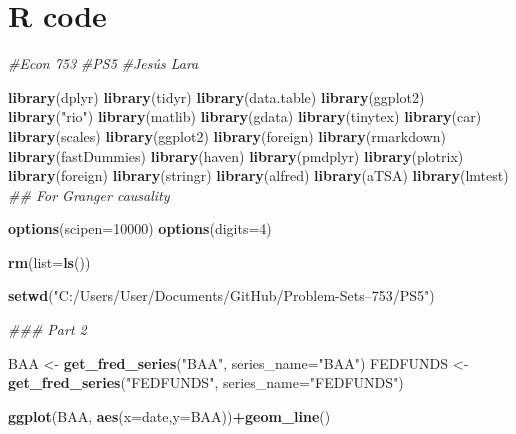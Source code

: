 \documentclass[
]{article}
\newenvironment{Shaded}{\begin{snugshade}}{\end{snugshade}}
\newcommand{\CommentTok}[1]{\textcolor[rgb]{0.56,0.35,0.01}{\textit{#1}}}
\newcommand{\DataTypeTok}[1]{\textcolor[rgb]{0.13,0.29,0.53}{#1}}
\newcommand{\DecValTok}[1]{\textcolor[rgb]{0.00,0.00,0.81}{#1}}
\newcommand{\KeywordTok}[1]{\textcolor[rgb]{0.13,0.29,0.53}{\textbf{#1}}}
\newcommand{\NormalTok}[1]{#1}
\newcommand{\OperatorTok}[1]{\textcolor[rgb]{0.81,0.36,0.00}{\textbf{#1}}}
\newcommand{\StringTok}[1]{\textcolor[rgb]{0.31,0.60,0.02}{#1}}
\begin{document}
\pagebreak

\hypertarget{r-code}{%
\section{R code}\label{r-code}}

\begin{Shaded}
\begin{Highlighting}[]
\CommentTok{#Econ 753}
\CommentTok{#PS5}
\CommentTok{#Jesús Lara}

\KeywordTok{library}\NormalTok{(dplyr)}
\KeywordTok{library}\NormalTok{(tidyr)}
\KeywordTok{library}\NormalTok{(data.table)}
\KeywordTok{library}\NormalTok{(ggplot2)}
\KeywordTok{library}\NormalTok{(}\StringTok{"rio"}\NormalTok{)}
\KeywordTok{library}\NormalTok{(matlib)}
\KeywordTok{library}\NormalTok{(gdata)}
\KeywordTok{library}\NormalTok{(tinytex)}
\KeywordTok{library}\NormalTok{(car)}
\KeywordTok{library}\NormalTok{(scales)}
\KeywordTok{library}\NormalTok{(ggplot2)}
\KeywordTok{library}\NormalTok{(foreign)}
\KeywordTok{library}\NormalTok{(rmarkdown)}
\KeywordTok{library}\NormalTok{(fastDummies)}
\KeywordTok{library}\NormalTok{(haven)}
\KeywordTok{library}\NormalTok{(pmdplyr)}
\KeywordTok{library}\NormalTok{(plotrix)}
\KeywordTok{library}\NormalTok{(foreign)}
\KeywordTok{library}\NormalTok{(stringr)}
\KeywordTok{library}\NormalTok{(alfred)}
\KeywordTok{library}\NormalTok{(aTSA)}
\KeywordTok{library}\NormalTok{(lmtest)  }\CommentTok{## For Granger causality}


\KeywordTok{options}\NormalTok{(}\DataTypeTok{scipen=}\DecValTok{10000}\NormalTok{)}
\KeywordTok{options}\NormalTok{(}\DataTypeTok{digits=}\DecValTok{4}\NormalTok{)}

\KeywordTok{rm}\NormalTok{(}\DataTypeTok{list=}\KeywordTok{ls}\NormalTok{())}

\KeywordTok{setwd}\NormalTok{(}\StringTok{"C:/Users/User/Documents/GitHub/Problem-Sets--753/PS5"}\NormalTok{)}

\CommentTok{### Part 2}

\NormalTok{BAA  <-}\StringTok{ }\KeywordTok{get_fred_series}\NormalTok{(}\StringTok{"BAA"}\NormalTok{, }\DataTypeTok{series_name=}\StringTok{"BAA"}\NormalTok{)   }
\NormalTok{FEDFUNDS  <-}\StringTok{ }\KeywordTok{get_fred_series}\NormalTok{(}\StringTok{"FEDFUNDS"}\NormalTok{, }\DataTypeTok{series_name=}\StringTok{"FEDFUNDS"}\NormalTok{) }


\KeywordTok{ggplot}\NormalTok{(BAA, }\KeywordTok{aes}\NormalTok{(}\DataTypeTok{x=}\NormalTok{date,}\DataTypeTok{y=}\NormalTok{BAA))}\OperatorTok{+}\KeywordTok{geom_line}\NormalTok{()}


\end{Highlighting}
\end{Shaded}
\end{document}
